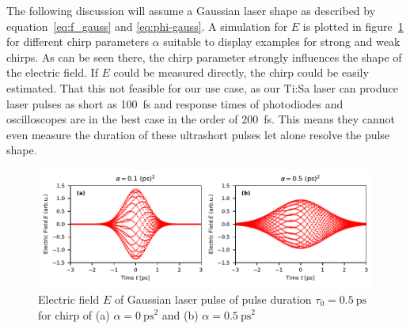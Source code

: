The following discussion will assume a Gaussian laser shape as described by equation~\eqref{eq:f_gauss} and \eqref{eq:phi-gauss}.
A simulation for $E$ is plotted in figure~\ref{fig:chirpedlaserpulse} for different chirp parameters $\alpha$ suitable to display examples for strong and weak chirps.
As can be seen there, the chirp parameter strongly influences the shape of the electric field.
If $E$ could be measured directly, the chirp could be easily estimated.
That this not feasible for our use case, as our Ti:Sa laser can produce laser pulses as short as \SI{100}{\femto \second} and response times of photodiodes and oscilloscopes are in the best case in the order of \SI{200}{\femto \second}.
This means they cannot even measure the duration of these ultrashort pulses let alone resolve the pulse shape.

\begin{figure}[H]
	\centering
	\includegraphics[width=\linewidth]{figures/chirp/plots/chirped_laser_pulse}
	\caption{Electric field $E$ of Gaussian laser pulse of pulse duration $\tau_0=\SI{0.5}{\pico \second}$ for chirp of (a) $\alpha = \SI{0}{\pico \second \squared}$ and (b) $\alpha = \SI{0.5}{\pico \second \squared}$}
	\label{fig:chirpedlaserpulse}
\end{figure}

\newpage

